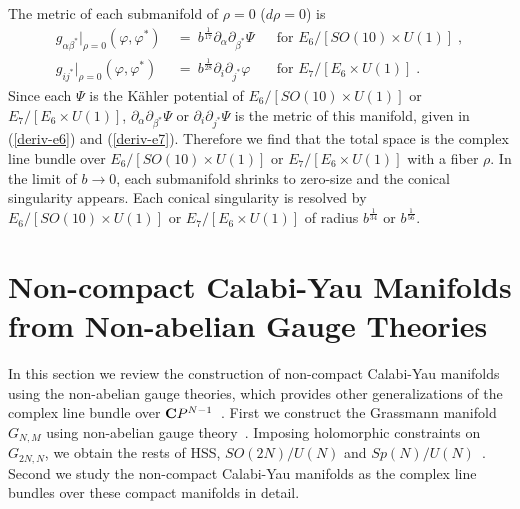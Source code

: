 \documentclass[a4paper,11pt]{article}
\newcommand{\del}{\partial}
\newcommand{\kahler}{K\"{a}hler }
\newcommand{\bsubeq}{\begin{subequations}}
\newcommand{\esubeq}{\end{subequations}}
\begin{document}
{The metric of each submanifold of 
$\rho = 0$ ($d \rho = 0$) is 
\bsubeq
\begin{align}
g_{\alpha \beta^*} \big|_{\rho = 0} (\varphi, \varphi^*) 
\ &= \
b^{\frac{1}{17}} \del_{\alpha} \del_{\beta^*} \Psi  
&& \mbox{for $E_6 / [SO(10) \times U(1)]$} \; , \\
g_{i j^*} \big|_{\rho = 0} (\varphi, \varphi^*) 
\ &= \
b^{\frac{1}{28}} \del_i \del_{j^*} \varphi 
&& \mbox{for $E_7 / [ E_6 \times U(1)]$} \; .
\end{align}
\esubeq
Since each $\Psi$ is the \kahler potential 
of $E_6/[SO(10) \times U(1)]$ or $E_7 / [E_6 \times U(1)]$, 
$\del_{\alpha} \del_{\beta^*} \Psi$ or 
$\del_i \del_{j^*} \Psi$ is the metric of this manifold, 
given in (\ref{deriv-e6}) and (\ref{deriv-e7}).
Therefore we find that the total space is 
the complex line bundle 
over $E_6/[SO(10) \times U(1)]$ 
or $E_7 / [E_6 \times U(1)]$ with a fiber $\rho$.
In the limit of $b \to 0$,
each submanifold shrinks to zero-size and 
the conical singularity appears. 
Each conical singularity is resolved by $E_6 / [SO(10) \times U(1)]$
or $E_7 / [E_6 \times U(1)]$ of radius $b^{\frac{1}{34}}$ or
$b^{\frac{1}{56}}$.



\section{Non-compact Calabi-Yau Manifolds from 
Non-abelian Gauge Theories} \label{LG}

In this section we review the construction of 
non-compact Calabi-Yau manifolds 
using the non-abelian gauge theories, 
which provides other generalizations of 
the complex line bundle over ${\bf C}P^{N-1}$~\cite{HKN3}.
First we construct the Grassmann manifold
$G_{N,M}$ using non-abelian gauge theory~\cite{Ao,HKLR}.  
Imposing holomorphic constraints on $G_{2N,N}$, 
we obtain the rests of HSS, 
$SO(2N)/U(N)$ and $Sp(N)/U(N)$~\cite{HN1}.
Second we study the non-compact Calabi-Yau manifolds 
as the complex line bundles 
over these compact manifolds in detail.

}
\end{document}
